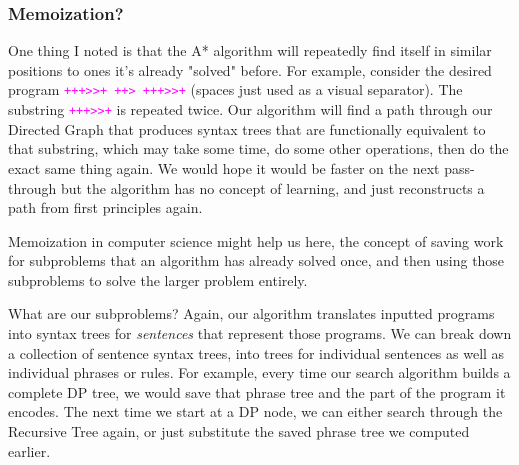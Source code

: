 \documentclass[runningheads]{llncs}
\newcommand{\code}[1]{\texttt{\textcolor{magenta}{\setlength{\fboxsep}{1pt}\colorbox{lightgray!20}{#1}}}}
\begin{document}
\subsubsection*{Memoization?}
One thing I noted is that the A* algorithm will repeatedly find itself in similar positions to ones it's already "solved" before. For example, consider the desired program \code{+++>>+ ++> +++>>+} (spaces just used as a visual separator). The substring \code{+++>>+} is repeated twice. Our algorithm will find a path through our Directed Graph that produces syntax trees that are functionally equivalent to that substring, which may take some time, do some other operations, then do the exact same thing again. We would hope it would be faster on the next pass-through but the algorithm has no concept of learning, and just reconstructs a path from first principles again.

Memoization in computer science might help us here, the concept of saving work for subproblems that an algorithm has already solved once, and then using those subproblems to solve the larger problem entirely.

What are our subproblems? Again, our algorithm translates inputted programs into syntax trees for \textit{sentences} that represent those programs. We can break down a collection of sentence syntax trees, into trees for individual sentences as well as individual phrases or rules. For example, every time our search algorithm builds a complete DP tree, we would save that phrase tree and the part of the program it encodes. The next time we start at a DP node, we can either search through the Recursive Tree again, or just substitute the saved phrase tree we computed earlier.
\end{document}
